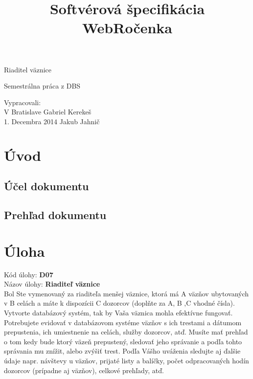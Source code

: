 \documentclass[slovak, 12pt, Times New Roman]{article}
\begin{document}
	\thispagestyle{fancy}
		\begin{center}\huge{Riaditel väznice\\\par}Semestrálna práca z DBS\end{center}
	\title{Softvérová špecifikácia WebRočenka}
	\date{}

	\begin{minipage}[b]{\textwidth}
	    \vspace{110mm}	 
	    \large   	\hspace{110mm} Vypracovali:\\
	    V Bratislave \hspace{82mm} Gabriel Kerekeš \\
	    1. Decembra 2014 \hspace{70mm} Jakub Jahnič \\
	    \vspace{-20mm} 
	\end{minipage}

	\clearpage
	\tableofcontents
	\clearpage

	\section{Úvod}
		\subsection{Účel dokumentu}

		\subsection{Prehľad dokumentu}
	\section{Úloha}
		Kód úlohy: \textbf{D07} \\
		Názov úlohy: \textbf{Riaditeľ väznice} \\

		Bol Ste vymenovaný za riaditeľa menšej väznice, ktorá má A väzňov ubytovaných v B celách a máte k dispozícii C dozorcov (doplňte za A, B
		,C vhodné čísla). Vytvorte databázový systém, tak by Vaša väznica mohla efektívne fungovať. Potrebujete evidovať v databázovom systéme 
		väzňov s ich trestami a dátumom prepustenia, ich umiestnenie na celách, služby dozorcov, atď. Musíte mať prehľad o tom kedy bude ktorý 
		väzeň prepustený, sledovať jeho správanie a podľa tohto správania mu znížit, alebo zvýšiť trest. Podľa Vášho uváženia sledujte aj 
		ďalšie údaje napr. návštevy u väzňov, prijaté listy a balíčky, počet odpracovaných hodín dozorcov (prípadne aj väzňov), celkové 
		prehľady, atď.
\end{document}
